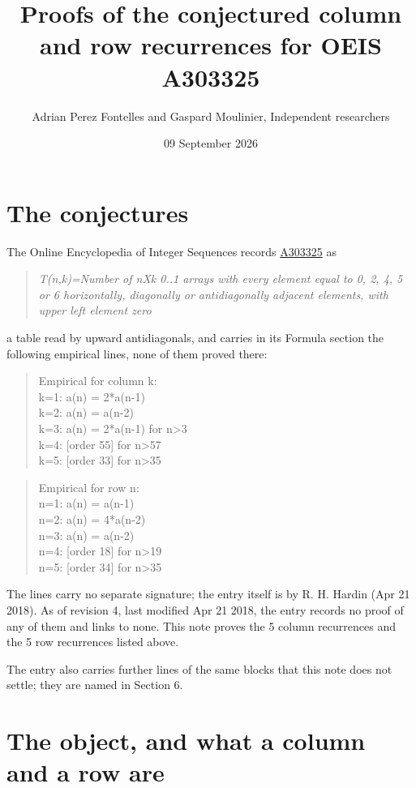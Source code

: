 \documentclass[11pt]{article}
\title{Proofs of the conjectured column and row recurrences for OEIS A303325}
\author{Adrian Perez Fontelles and Gaspard Moulinier, Independent researchers}
\date{09 September 2026}
\theoremstyle{definition}
\begin{document}
\maketitle
\section{The conjectures}

The Online Encyclopedia of Integer Sequences records \href{https://oeis.org/A303325}{A303325} as

\begin{quote}\itshape T(n,k)=Number of nXk 0..1 arrays with every element equal to 0, 2, 4, 5 or 6 horizontally, diagonally or antidiagonally adjacent elements, with upper left element zero\end{quote}

a table read by upward antidiagonals, and carries in its Formula section the following empirical lines, none of them proved there:

\begin{quote}\ttfamily Empirical for column k:\\
k=1: a(n) = 2*a(n-1)\\k=2: a(n) = a(n-2)\\k=3: a(n) = 2*a(n-1) for n>3\\k=4: [order 55] for n>57\\k=5: [order 33] for n>35\end{quote}

\begin{quote}\ttfamily Empirical for row n:\\
n=1: a(n) = a(n-1)\\n=2: a(n) = 4*a(n-2)\\n=3: a(n) = a(n-2)\\n=4: [order 18] for n>19\\n=5: [order 34] for n>35\end{quote}

The lines carry no separate signature; the entry itself is by R. H. Hardin (Apr 21 2018). As of revision 4, last modified Apr 21 2018, the entry records no proof of any of them and links to none. This note proves the 5 column recurrences and the 5 row recurrences listed above.

The entry also carries further lines of the same blocks that this note does not settle; they are named in Section 6.

\section{The object, and what a column and a row are}
\end{document}
